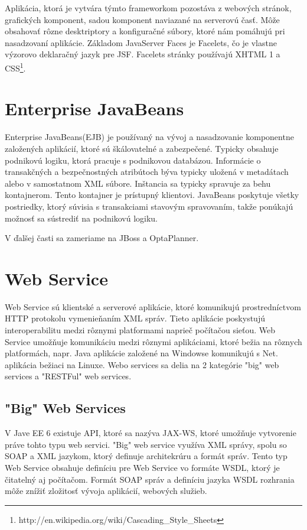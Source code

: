 \indent Aplikácia, ktorá je vytvára týmto frameworkom pozostáva z webových stránok, grafických komponent, sadou komponent naviazané na serverovú časť. Môže obsahovať rôzne desktriptory a konfiguračné súbory, ktoré nám pomáhujú pri nasadzovaní aplikácie. Základom JavaServer Faces je Facelets, čo je vlastne výzorovo deklaračný jazyk pre JSF. Facelets stránky používajú XHTML 1 a CSS\footnote{http://en.wikipedia.org/wiki/Cascading\_Style\_Sheets}. 

\section{Enterprise JavaBeans}
Enterprise JavaBeans(EJB) je používaný na vývoj a nasadzovanie komponentne založených aplikácií, ktoré sú škálovatelné a zabezpečené. Typicky obsahuje podnikovú logiku, ktorá pracuje s podnikovou databázou. Informácie o transakčných a bezpečnostných atribútoch býva typicky uložená v metadátach alebo v samostatnom XML súbore. Inštancia sa typicky spravuje za behu kontajnerom. Tento kontajner je prístupný klientovi. JavaBeans poskytuje všetky postriedky, ktorý súvisia s transakciami stavovým spravovaním, takže ponúkajú možnosť sa sústrediť na podnikovú logiku. 

V ďalšej časti sa zameriame na JBoss a OptaPlanner.

\section{Web Service}
Web Service  sú klientské a serverové aplikácie, ktoré komunikujú prostredníctvom HTTP protokolu vymenieňaním XML správ. Tieto aplikácie poskystujú interoperabilitu medzi rôznymi platformami naprieč počítačou sieťou. Web Service umožňuje komunikáciu medzi rôznymi aplikáciami, ktoré bežia na rôznych platformách, napr. Java aplikácie založené na Windowse komunikujú s Net. aplikácia bežiaci na Linuxe. Webo services  sa delia na 2 kategórie "big" web services a "RESTFul" web services.

\subsection{"Big" Web Services}
V Jave EE 6 existuje API, ktoré sa nazýva JAX-WS, ktoré umožňuje vytvorenie práve tohto typu web servici.\cite{fitWeb} "Big" web service využíva XML správy, spolu so SOAP a XML jazykom, ktorý definuje architekrúru a formát správ. Tento typ Web Service obsahuje definíciu pre Web Service vo formáte WSDL, ktorý je čitatelný aj počítačom. Formát SOAP správ a definíciu jazyka WSDL rozhrania môže znížiť zložitosť vývoja aplikácií, webových služieb. 

